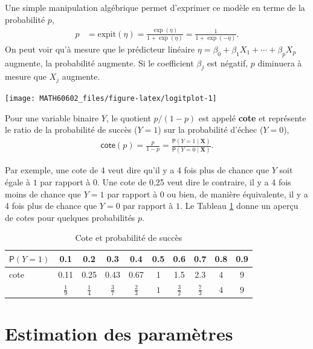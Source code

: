 \documentclass[
  11pt,
  letterpaper,
]{book}
\theoremstyle{definition}
\theoremstyle{definition}
\theoremstyle{definition}
\theoremstyle{remark}
\begin{document}
Une simple manipulation algébrique permet d'exprimer ce modèle en terme de la probabilité \(p\),
\begin{align*}
 p &= \mathrm{expit}(\eta) = \frac{\exp(\eta)}{1+\exp(\eta)}
= \frac{1}{1+\exp(-\eta)}.
\end{align*}
On peut voir qu'à mesure que le prédicteur linéaire \(\eta=\beta_0+\beta_1X_1 + \cdots + \beta_pX_p\) augmente, la probabilité augmente.
Si le coefficient \(\beta_j\) est négatif, \(p\) diminuera à mesure que \(X_j\) augmente.

\begin{center}\texttt{[image: MATH60602\_files/figure-latex/logitplot-1]} \end{center}

Pour une variable binaire \(Y\), le quotient \(p/(1-p)\) est appelé \textbf{cote} et représente le ratio de la probabilité de succès (\(Y=1\)) sur la probabilité d'échec (\(Y=0\)),
\begin{align*}
 \mathsf{cote}(p) = \frac{p}{1-p} = \frac{{\mathsf P}\left(Y=1 \mid \boldsymbol{X}\right)}{{\mathsf P}\left(Y=0 \mid \boldsymbol{X}\right)}.
\end{align*}

Par exemple, une cote de 4 veut dire qu'il y a 4 fois plus de chance que \(Y\) soit égale à \(1\) par rapport à \(0\). Une cote de 0,25 veut dire le contraire, il y a 4 fois moins de chance que \(Y=1\) par rapport à \(0\) ou bien, de manière équivalente, il y a 4 fois plus de chance que \(Y=0\) par rapport à \(1\). Le Tableau \ref{tab:03-cotes} donne un aperçu de cotes pour quelques probabilités \(p\).

\begin{table}

\caption{\label{tab:03-cotes}Cote et probabilité de succès}
\centering
\begin{tabular}[t]{lccccccccc}
\toprule
${\mathsf P}\left(Y=1\right)$ & 0.1 & 0.2 & 0.3 & 0.4 & 0.5 & 0.6 & 0.7 & 0.8 & 0.9\\
\midrule
cote & 0.11 & 0.25 & 0.43 & 0.67 & 1 & 1.5 & 2.3 & 4 & 9\\
 & $\frac{1}{9}$ & $\frac{1}{4}$ & $\frac{3}{7}$ & $\frac{2}{3}$ & $1$ & $\frac{3}{2}$ & $\frac{7}{3}$ & $4$ & $9$\\
\bottomrule
\end{tabular}
\end{table}

\hypertarget{estimation-des-paramuxe8tres}{%
\section{Estimation des paramètres}\label{estimation-des-paramuxe8tres}}
\end{document}
